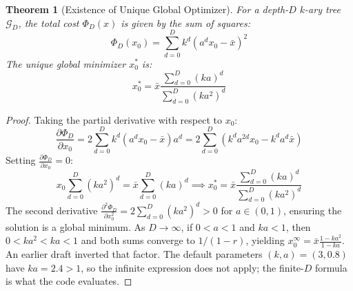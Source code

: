 \documentclass{article}
\newtheorem{theorem}{Theorem}
\begin{document}
\begin{theorem}[Existence of Unique Global Optimizer]
For a depth-$D$ $k$-ary tree $\mathcal{G}_D$, the total cost $\Phi_D(x)$ is given by the sum of squares:
\[ \Phi_D(x_0) = \sum_{d=0}^D k^d (a^d x_0 - \bar{x})^2 \]
The unique global minimizer $x_0^*$ is:
\[ x_0^* = \bar{x} \frac{\sum_{d=0}^D (ka)^d}{\sum_{d=0}^D (ka^2)^d} \]
\end{theorem}

\begin{proof}
Taking the partial derivative with respect to $x_0$:
\[ \frac{\partial \Phi_D}{\partial x_0} = 2 \sum_{d=0}^D k^d (a^d x_0 - \bar{x}) a^d = 2 \sum_{d=0}^D (k^d a^{2d} x_0 - k^d a^d \bar{x}) \]
Setting $\frac{\partial \Phi_D}{\partial x_0} = 0$:
\[ x_0 \sum_{d=0}^D (k a^2)^d = \bar{x} \sum_{d=0}^D (k a)^d \implies x_0^* = \bar{x} \frac{\sum_{d=0}^D (k a)^d}{\sum_{d=0}^D (k a^2)^d} \]
The second derivative $\frac{\partial^2 \Phi_D}{\partial x_0^2} = 2 \sum_{d=0}^D (k a^2)^d > 0$ for $a \in (0,1)$, ensuring the solution is a global minimum. As $D \to \infty$, if $0<a<1$ and $ka<1$, then $0<ka^2<ka<1$ and both sums converge to $1/(1-r)$, yielding $x_0^\infty = \bar{x} \frac{1-ka^2}{1-ka}$. An earlier draft inverted that factor. The default parameters $(k,a)=(3,0.8)$ have $ka=2.4>1$, so the infinite expression does not apply; the finite-$D$ formula is what the code evaluates.
\end{proof}
\end{document}
